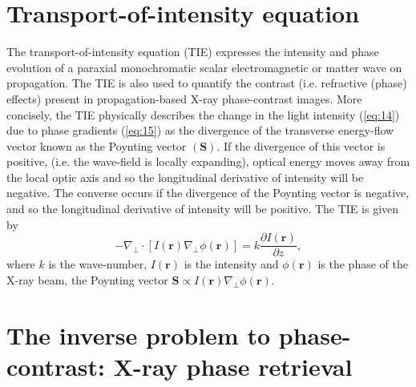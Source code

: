 \documentclass[10pt, a4paper, singlespacing]{report}
\begin{document}
\section{Transport-of-intensity equation}\label{TIE}

The transport-of-intensity equation (TIE) expresses the intensity and phase evolution of a paraxial monochromatic scalar electromagnetic or matter wave on propagation\cite{Pags2002}. The TIE is also used to quantify the contrast (i.e. refractive (phase) effects) present in propagation-based X-ray phase-contrast images\cite{PagsTutes}.
More concisely, the TIE physically describes the change in the light intensity (\ref{eq:14}) due to phase gradients (\ref{eq:15}) as the divergence of the transverse energy-flow vector known as the Poynting vector $(\textbf{S})$. If the divergence of this vector is positive, (i.e. the wave-field is locally expanding), optical energy moves away from the local optic axis and so the longitudinal derivative of
intensity will be negative. The converse occurs if the divergence of the Poynting vector is negative, and so the longitudinal derivative of intensity will be positive\cite{PagsTutes}. The TIE is given by
\begin{equation}\label{eq:16}
-\nabla_{\perp} \cdot [I(\mathbf{r}) \nabla_{\perp} \phi(\mathbf{r})] = k \frac{\partial I (\mathbf{r})}{\partial z},
\end{equation}
where $k$ is the wave-number, $I(\mathbf{r})$ is the intensity and $\phi(\mathbf{r})$ is the phase of the X-ray beam, the Poynting vector $\textbf{S} \propto I(\mathbf{r}) \nabla_{\perp} \phi(\mathbf{r})$.

\section{The inverse problem to phase-contrast: X-ray phase retrieval}\label{PR}
\end{document}
